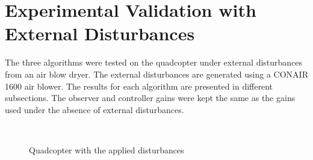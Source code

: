 \documentclass[letterpaper%
, twoside%
, 12pt%
,memoire%
, english%
,creativecommons,hyperref%
]{thETS}
\begin{document}
\section{Experimental Validation with External Disturbances}
The three algorithms were tested on the quadcopter under external disturbances from an air blow dryer. The external disturbances are generated using a CONAIR 1600 air blower. The results for each algorithm are presented in different subsections. The observer and controller gains were kept the same as the gains used under the absence of external disturbances.
\begin{figure}[H]
	\centering
	 \\ \parbox{0.75\textwidth}{\caption{{Quadcopter with the applied disturbances \label{Fig:dryer}}}}
\end{figure}
\end{document}

